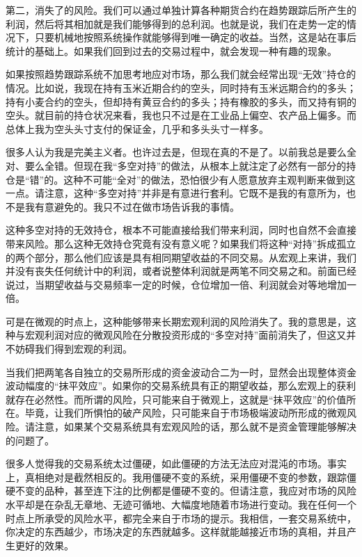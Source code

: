 第二，消失了的风险。我们可以通过单独计算各种期货合约在趋势跟踪后所产生的利润，然后将其相加就是我们能够得到的总利润。也就是说，我们在走势一定的情况下，只要机械地按照系统操作就能够得到唯一确定的收益。当然，这是站在事后统计的基础上。如果我们回到过去的交易过程中，就会发现一种有趣的现象。

如果按照趋势跟踪系统不加思考地应对市场，那么我们就会经常出现“无效”持仓的情况。比如说，我现在持有玉米近期合约的空头，同时持有玉米远期合约的多头；持有小麦合约的空头，但却持有黄豆合约的多头；持有橡胶的多头，而又持有铜的空头。就目前的持仓状况来看，我也只不过是在工业品上偏空、农产品上偏多。而总体上我为空头头寸支付的保证金，几乎和多头头寸一样多。

很多人认为我是完美主义者。也许过去是，但现在真的不是了。以前我总是要么全对、要么全错。但现在我“多空对持”的做法，从根本上就注定了必然有一部分的持仓是“错”的。这种不可能“全对”的做法，恐怕很少有人愿意放弃主观判断来做到这一点。请注意，这种“多空对持”并非是有意进行套利。它既不是我的有意所为，也不是我有意避免的。我只不过在做市场告诉我的事情。

这种多空对持的无效持仓，根本不可能直接给我们带来利润，同时也自然不会直接带来风险。那么这种无效持仓究竟有没有意义呢？如果我们将这种“对持”拆成孤立的两个部分，那么他们应该是具有相同期望收益的不同交易。从宏观上来讲，我们并没有丧失任何统计中的利润，或者说整体利润就是两笔不同交易之和。前面已经说过，当期望收益与交易频率一定的时候，仓位增加一倍、利润就会对等地增加一倍。

可是在微观的时点上，这种能够带来长期宏观利润的风险消失了。我的意思是，这种与宏观利润对应的微观风险在分散投资形成的“多空对持”面前消失了，但这又并不妨碍我们得到宏观的利润。

当我们把两笔各自独立的交易所形成的资金波动合二为一时，显然会出现整体资金波动幅度的“抹平效应”。如果你的交易系统具有正的期望收益，那么宏观上的获利就存在必然性。而所谓的风险，只可能来自于微观上，这就是“抹平效应”的价值所在。毕竟，让我们所惧怕的破产风险，只可能来自于市场极端波动所形成的微观风险。请注意，如果某个交易系统具有宏观风险的话，那么就不是资金管理能够解决的问题了。

很多人觉得我的交易系统太过僵硬，如此僵硬的方法无法应对混沌的市场。事实上，真相绝对是截然相反的。我用僵硬不变的系统，采用僵硬不变的参数，跟踪僵硬不变的品种，甚至连下注的比例都是僵硬不变的。但请注意，我应对市场的风险水平却是在杂乱无章地、无迹可循地、大幅度地随着市场进行变动。我在任何一个时点上所承受的风险水平，都完全来自于市场的提示。我相信，一套交易系统中，你决定的东西越少，市场决定的东西就越多。这样就能越接近市场的真相，并且产生更好的效果。

